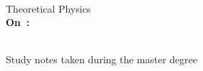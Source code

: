 \pagestyle{empty}
{\raggedleft\vspace*{\baselineskip}
{\LARGE \theauthor}\\[0.2\textheight]
{\LARGE Theoretical Physics }\\[\baselineskip]
{\HUGE \textcolor{mycolor}{\textbf{On~\thetitle:}}}\\[\baselineskip]
{\LARGE \subt }\\[\baselineskip]
{\large \thedate}\par
\vspace*{2\baselineskip}
\vfill
{\large Study notes taken during the master degree}\par
\vspace*{\baselineskip}}
\clearpage
\pagestyle{headings}
